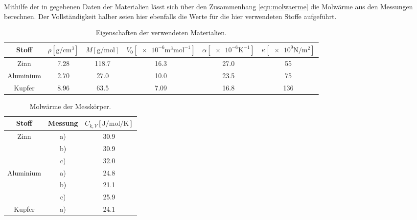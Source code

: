 Mithilfe der in \cite{Versuchsanleitung} gegebenen Daten der Materialien lässt sich über den Zusammenhang \eqref{eqn:molwaerme}
die Molwärme aus den Messungen berechnen. 
Der Vollständigkeit halber seien hier ebenfalls die Werte für die hier verwendeten Stoffe aufgeführt.
\begin{table}
    \centering
    \caption{Eigenschaften der verwendeten Materialien.}
    \label{tab:eigenschaften}
    \begin{tabular}{c S[table-format=1.2] S[table-format=3.1] S[table-format=2.2] S[table-format=2.1] S[table-format=3.0]}
        \toprule
        Stoff & $\rho[\si{\gram\per\centi\meter\tothe{3}}]$ & $M[\si{\g\per\mol}]$ & $V_{0}[\num{e-6}\si{\meter\tothe{3}\mol\tothe{-1}}]$ & $\alpha[\num{e-6}\si{\kelvin\tothe{-1}}]$ & $\kappa[\num{e9}\si{\newton\per\meter\squared}]$ \\
        \midrule
        Zinn        &7.28   &118.7  &16.3   &27.0   &55     \\
        Aluminium   &2.70   &27.0   &10.0   &23.5   &75     \\
        Kupfer      &8.96   &63.5   &7.09   &16.8   &136    \\
        \bottomrule
    \end{tabular}
\end{table}

\begin{table}
    \centering
    \caption{Molwärme der Messkörper.}
    \label{tab:C_k-Werte}
    \begin{tabular}{c c | S[table-format=4.2]}
        \toprule
        Stoff & Messung & $C_{k,V}[\si{\joule\per\mol\per\kelvin}]$ \\
        \midrule
        Zinn        & a) & 30.9 \\
                    & b) & 30.9 \\
                    & c) & 32.0 \\
        Aluminium   & a) & 24.8 \\
                    & b) & 21.1 \\
                    & c) & 25.9 \\
        Kupfer      & a) & 24.1 \\
        \bottomrule
    \end{tabular}
\end{table}

